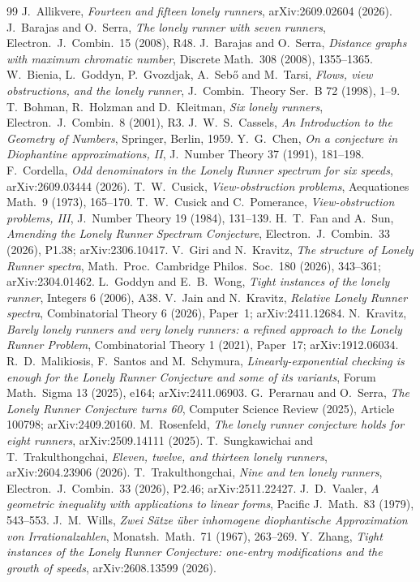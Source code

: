 \documentclass[12pt]{amsart}
\theoremstyle{definition}\newtheorem{definition}[theorem]{Definition}
\theoremstyle{remark}\newtheorem{remark}[theorem]{Remark}
\begin{document}
\begin{thebibliography}{99}
 J.~Allikvere, \emph{Fourteen and fifteen lonely runners}, arXiv:2609.02604 (2026).
 J.~Barajas and O.~Serra, \emph{The lonely runner with seven runners}, Electron.\ J.\ Combin.\ 15 (2008), R48.
 J.~Barajas and O.~Serra, \emph{Distance graphs with maximum chromatic number}, Discrete Math.\ 308 (2008), 1355--1365.
 W.~Bienia, L.~Goddyn, P.~Gvozdjak, A.~Seb\H{o} and M.~Tarsi, \emph{Flows, view obstructions, and the lonely runner}, J.\ Combin.\ Theory Ser.\ B 72 (1998), 1--9.
 T.~Bohman, R.~Holzman and D.~Kleitman, \emph{Six lonely runners}, Electron.\ J.\ Combin.\ 8 (2001), R3.
 J.~W.~S.~Cassels, \emph{An Introduction to the Geometry of Numbers}, Springer, Berlin, 1959.
 Y.~G.~Chen, \emph{On a conjecture in Diophantine approximations, II}, J.\ Number Theory 37 (1991), 181--198.
 F.~Cordella, \emph{Odd denominators in the Lonely Runner spectrum for six speeds}, arXiv:2609.03444 (2026).
 T.~W.~Cusick, \emph{View-obstruction problems}, Aequationes Math.\ 9 (1973), 165--170.
 T.~W.~Cusick and C.~Pomerance, \emph{View-obstruction problems, III}, J.\ Number Theory 19 (1984), 131--139.
 H.~T.~Fan and A.~Sun, \emph{Amending the Lonely Runner Spectrum Conjecture}, Electron.\ J.\ Combin.\ 33 (2026), P1.38; arXiv:2306.10417.
 V.~Giri and N.~Kravitz, \emph{The structure of Lonely Runner spectra}, Math.\ Proc.\ Cambridge Philos.\ Soc.\ 180 (2026), 343--361; arXiv:2304.01462.
 L.~Goddyn and E.~B.~Wong, \emph{Tight instances of the lonely runner}, Integers 6 (2006), A38.
 V.~Jain and N.~Kravitz, \emph{Relative Lonely Runner spectra}, Combinatorial Theory 6 (2026), Paper~1; arXiv:2411.12684.
 N.~Kravitz, \emph{Barely lonely runners and very lonely runners: a refined approach to the Lonely Runner Problem}, Combinatorial Theory 1 (2021), Paper~17; arXiv:1912.06034.
 R.~D.~Malikiosis, F.~Santos and M.~Schymura, \emph{Linearly-exponential checking is enough for the Lonely Runner Conjecture and some of its variants}, Forum Math.\ Sigma 13 (2025), e164; arXiv:2411.06903.
 G.~Perarnau and O.~Serra, \emph{The Lonely Runner Conjecture turns 60}, Computer Science Review (2025), Article 100798; arXiv:2409.20160.
 M.~Rosenfeld, \emph{The lonely runner conjecture holds for eight runners}, arXiv:2509.14111 (2025).
 T.~Sungkawichai and T.~Trakulthongchai, \emph{Eleven, twelve, and thirteen lonely runners}, arXiv:2604.23906 (2026).
 T.~Trakulthongchai, \emph{Nine and ten lonely runners}, Electron.\ J.\ Combin.\ 33 (2026), P2.46; arXiv:2511.22427.
 J.~D.~Vaaler, \emph{A geometric inequality with applications to linear forms}, Pacific J.\ Math.\ 83 (1979), 543--553.
 J.~M.~Wills, \emph{Zwei S\"atze \"uber inhomogene diophantische Approximation von Irrationalzahlen}, Monatsh.\ Math.\ 71 (1967), 263--269.
 Y.~Zhang, \emph{Tight instances of the Lonely Runner Conjecture: one-entry modifications and the growth of speeds}, arXiv:2608.13599 (2026).
\end{thebibliography}
\end{document}
